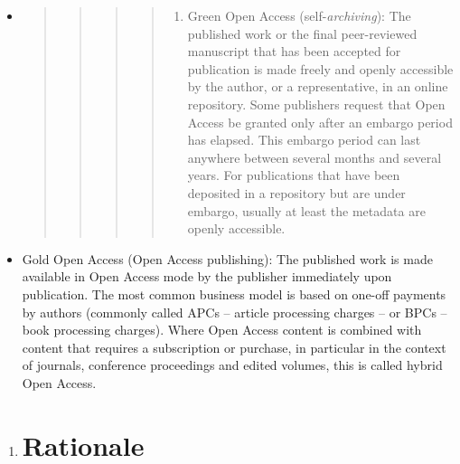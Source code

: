 \documentclass{article}
\begin{document}
\begin{itemize}
\item 
\begin{quote}


\begin{quote}


\begin{quote}


\begin{quote}


\begin{enumerate}
\item Green Open Access (self-\emph{archiving}): The published work or the final peer-reviewed manuscript that has been accepted for publication is made freely and openly accessible by the author, or a representative, in an online repository. Some publishers request that Open Access be granted only after an embargo period has elapsed. This embargo period can last anywhere between several months and several years. For publications that have been deposited in a repository but are under embargo, usually at least the metadata are openly accessible.


\end{enumerate}

\end{quote}


\end{quote}


\end{quote}


\end{quote}


\item Gold Open Access (Open Access publishing): The published work is made available in Open Access mode by the publisher immediately upon publication. The most common business model is based on one-off payments by authors (commonly called APCs – article processing charges – or BPCs – book processing charges). Where Open Access content is combined with content that requires a subscription or purchase, in particular in the context of journals, conference proceedings and edited volumes, this is called hybrid Open Access.


\end{itemize}
\begin{enumerate}
\item \section{Rationale}\label{rationale}



\end{enumerate}
\end{document}
